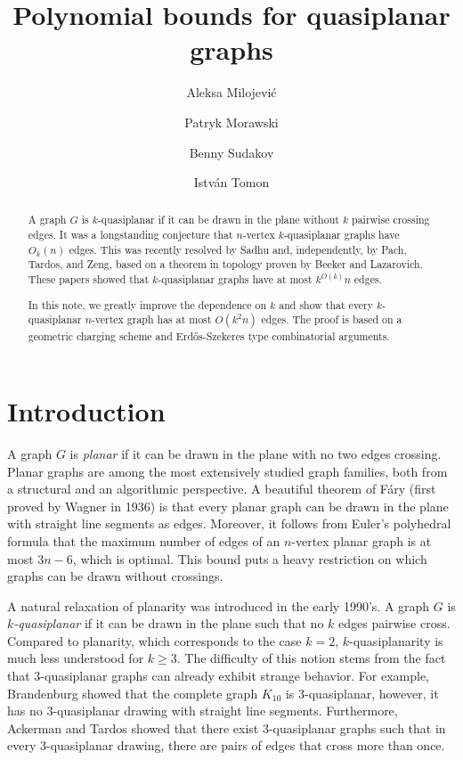 \documentclass[11pt]{amsart}
\title{Polynomial bounds for quasiplanar graphs}
\author{Aleksa Milojevi\'c}
\author{Patryk Morawski}
\author{Benny Sudakov}
\author{Istv\'an Tomon}
\date{}
\theoremstyle{definition}
\begin{document}
\sloppy 
\begin{abstract}
A graph $G$ is $k$-quasiplanar if it can be drawn in the plane without $k$ pairwise crossing edges. It was a longstanding conjecture that $n$-vertex $k$-quasiplanar graphs have $O_k(n)$ edges. This was recently resolved by Sadhu and, independently, by Pach, Tardos, and Zeng, based on a theorem in topology proven by Beeker and Lazarovich. These papers showed that $k$-quasiplanar graphs have at most $k^{O(k)}n$ edges.

In this note, we greatly improve the dependence on $k$ and show that every $k$-quasiplanar $n$-vertex graph has at most $O(k^2n)$ edges. The proof is based on a geometric charging scheme and Erd\H{o}s-Szekeres type combinatorial arguments.
\end{abstract}

\maketitle

\vspace{-0.7cm}

\section{Introduction}

A graph $G$ is \textit{planar} if it can be drawn in the plane with no two edges crossing. Planar graphs are among the most extensively studied graph families, both from a structural and an algorithmic perspective. A beautiful theorem of F\'ary \cite{Fary} (first proved by Wagner in 1936) is that every planar graph can be drawn in the plane with straight line segments as edges. Moreover, it follows from Euler's polyhedral formula that the maximum number of edges of an $n$-vertex planar graph is at most $3n-6$, which is optimal. This bound puts a heavy restriction on which graphs can be drawn without crossings.

A natural relaxation of planarity was introduced in the early 1990's. A graph $G$ is \emph{$k$-quasiplanar} if it can be drawn in the plane such that no $k$ edges pairwise cross. Compared to planarity, which corresponds to the case $k=2$, $k$-quasiplanarity is much less understood for $k\geq 3$. The difficulty of this notion stems from the fact that  3-quasiplanar graphs can already exhibit strange behavior. For example, Brandenburg \cite{Brandenburg} showed that the complete graph $K_{10}$ is 3-quasiplanar, however, it has no 3-quasiplanar drawing with straight line segments. Furthermore, Ackerman and Tardos \cite{AT} showed that there exist $3$-quasiplanar graphs such that in every 3-quasiplanar drawing, there are pairs of edges that cross more than once.
\end{document}
